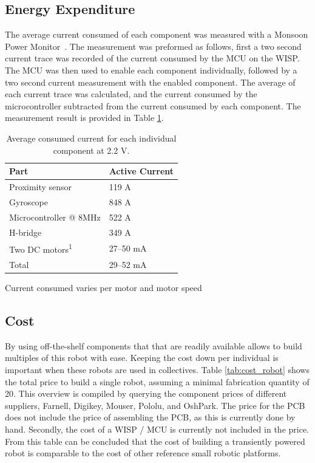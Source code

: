 \subsection{Energy Expenditure}

The average current consumed of each component was measured with a Monsoon Power Monitor~\cite{monsoon_powermonitor_2017}.
The measurement was preformed as follows, first a two second current trace was recorded of the current consumed by the MCU on the WISP.
The MCU was then used to enable each component individually, followed by a two second current measurement with the enabled component.
The average of each current trace was calculated, and the current consumed by the microcontroller subtracted from the current consumed by each component.
The measurement result is provided in Table \ref{tab:avg_cur_comp}.


\begin{table}[t]
	\centering
	\begin{threeparttable}
		\caption{Average consumed current for each individual component at 2.2 V.}
		\label{tab:avg_cur_comp}
		\begin{tabular}{|l|l|} 
			\hline
			Part & Active Current \\
			\hline\hline
			Proximity sensor & 119 \textmu A \\
			Gyroscope & 848 \textmu A\\	
			Microcontroller @ 8MHz & 522 \textmu A\\
			H-bridge & 349 \textmu A \\
			Two DC motors\textsuperscript{1} & 27--50 mA  \\
			\hline \hline
			Total & 29--52 mA \\
			\hline
		\end{tabular}
		\begin{tablenotes}
		\small
		\item [1] Current consumed varies per motor and motor speed
		\end{tablenotes}
	\end{threeparttable}
\end{table}

\subsection{Cost}

By using off-the-shelf components that that are readily available allows to build multiples of this robot with ease.
Keeping the cost down per individual is important when these robots are used in collectives.
Table \ref{tab:cost_robot} shows the total price to build a single robot, assuming a minimal fabrication quantity of 20.
This overview is compiled by querying the component prices of different suppliers, Farnell, Digikey, Mouser, Pololu, and OshPark.
The price for the PCB does not include the price of assembling the PCB, as this is currently done by hand.
Secondly, the cost of a WISP / MCU is currently not included in the price.
From this table can be concluded that the cost of building a transiently powered robot is comparable to the cost of other reference small robotic platforms.


